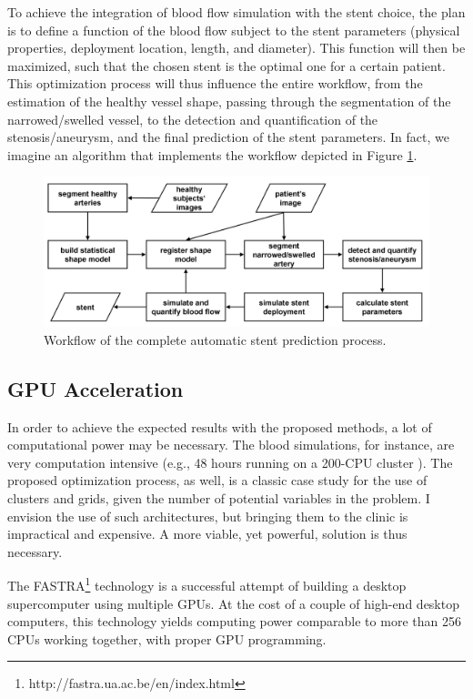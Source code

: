 To achieve the integration of blood flow simulation with the stent choice, the plan is to define a function of the blood flow subject to the stent parameters (physical properties, deployment location, length, and diameter). This function will then be maximized, such that the chosen stent is the optimal one for a certain patient. This optimization process will thus influence the entire workflow, from the estimation of the healthy vessel shape, passing through the segmentation of the narrowed/swelled vessel, to the detection and quantification of the stenosis/aneurysm, and the final prediction of the stent parameters. In fact, we imagine an algorithm that implements the workflow depicted in Figure \ref{fig:workflow}. 

\begin{figure}%
\centering
\includegraphics[width=0.8\columnwidth]{workflow.png}%
\caption{Workflow of the complete automatic stent prediction process.}%
\label{fig:workflow}%
\end{figure}

\subsection{GPU Acceleration}

\challenge
In order to achieve the expected results with the proposed methods, a lot of computational power may be necessary. The blood simulations, for instance, are very computation intensive (e.g., 48 hours running on a 200-CPU cluster \citep{deBeule}). The proposed optimization process, as well, is a classic case study for the use of clusters and grids, given the number of potential variables in the problem. I envision the use of such architectures, but bringing them to the clinic is impractical and expensive. A more viable, yet powerful, solution is thus necessary.

The FASTRA\footnote{http://fastra.ua.ac.be/en/index.html} technology is a successful attempt of building a desktop supercomputer using multiple GPUs. At the cost of a couple of high-end desktop computers, this technology yields computing power comparable to more than 256 CPUs working together, with proper GPU programming.

